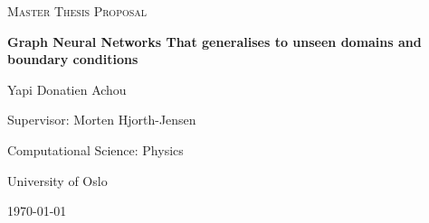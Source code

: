 \documentclass[11pt, a4paper]{article}
\newcommand{\thesistitle}{Graph Neural Networks That generalises to unseen domains and boundary conditions}
\newcommand{\authorname}{Yapi Donatien Achou}
\newcommand{\supervisorname}{Morten Hjorth-Jensen}
\newcommand{\programmename}{Computational Science: Physics}
\newcommand{\institution}{University of Oslo}
\begin{document}
\begin{titlepage}
\centering
\vspace*{25mm}

{\Large\scshape Master Thesis Proposal\par}
\vspace{16mm}

{\LARGE\bfseries \thesistitle \par}

\vspace{20mm}
{\large \authorname \par}
\vspace{4mm}
{\normalsize Supervisor: \supervisorname \par}

\vfill
{\normalsize \programmename \par}
{\normalsize \institution \par}
\vspace{4mm}
{\normalsize \today \par}
\vspace*{20mm}
\end{titlepage}

\begin{abstract}
\noindent
\end{abstract}

%

\vspace{6mm}
\tableofcontents
\newpage
\end{document}
